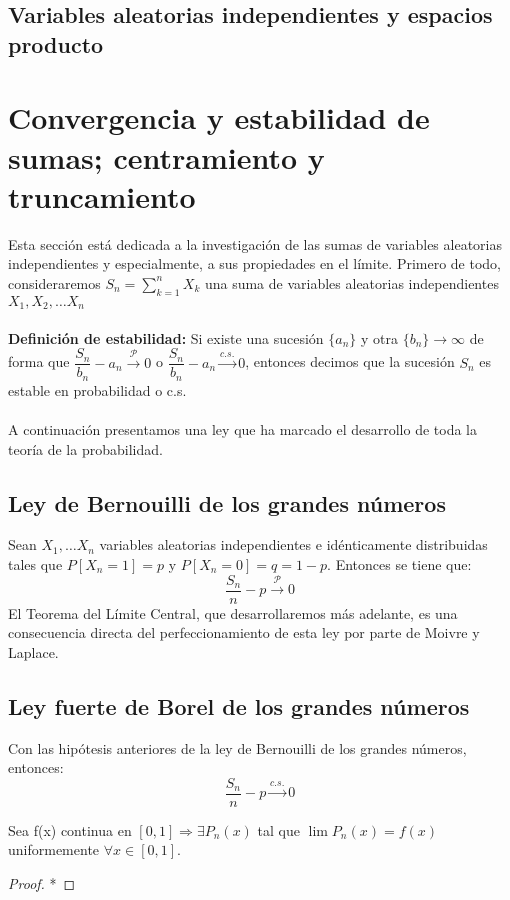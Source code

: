 \documentclass[12pt,a4paper]{book}
\begin{document}
\subsection{Variables aleatorias independientes y espacios producto}
\section{Convergencia y estabilidad de sumas; centramiento y truncamiento}
Esta sección está dedicada a la investigación de las sumas de variables aleatorias independientes y especialmente, a sus propiedades en el límite. Primero de todo, consideraremos $S_n=\displaystyle\sum_{k=1}^n X_k$ una suma de variables aleatorias independientes $X_1, X_2,\ldots X_n$
\\\\
\textbf{Definición de estabilidad: }Si existe una sucesión $\{a_n\}$ y otra $\{b_n\} \rightarrow \infty$ de forma que $\dfrac{S_n}{b_n}-a_n\stackrel{\mathcal{P}}{\rightarrow}0$ o $\dfrac{S_n}{b_n}-a_n\stackrel{c.s.}{\rightarrow}0$, entonces decimos que la sucesión $S_n$ es estable en probabilidad o c.s. 
\\\\
A continuación presentamos una ley que ha marcado el desarrollo de toda la teoría de la probabilidad.


\subsection{Ley de Bernouilli de los grandes números} %
Sean $X_1,\ldots X_n$ variables aleatorias independientes e idénticamente distribuidas tales que $P[X_n=1]=p$ y $P[X_n=0]=q=1-p$. Entonces se tiene que:
$$\dfrac{S_n}{n}-p \stackrel{\mathcal{P}}{\longrightarrow}0$$
El Teorema del Límite Central, que desarrollaremos más adelante, es una consecuencia directa del perfeccionamiento de esta ley por parte de Moivre y Laplace.

\subsection{Ley fuerte de Borel de los grandes números} %
Con las hipótesis anteriores de la ley de Bernouilli de los grandes números, entonces: $$\dfrac{S_n}{n}-p \stackrel{c.s.}{\longrightarrow}0$$
\begin{theorem}
Sea f(x) continua en $[0,1] \Rightarrow \exists {P_n(x)}$ tal que $\lim P_n (x) = f(x)$ uniformemente $ \forall x \in [0,1]$.
\end{theorem}
\begin{proof}*
\end{proof}
\end{document}
